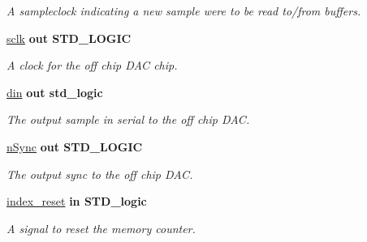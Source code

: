 \begin{DoxyCompactItemize}
\begin{DoxyCompactList}\small\item\em A sampleclock indicating a new sample were to be read to/from buffers. \end{DoxyCompactList}\item 
\hypertarget{classdac__Top_a6d01fe70bfcd66f305c9c962331782cd}{\hyperlink{classdac__Top_a6d01fe70bfcd66f305c9c962331782cd}{sclk}  {\bfseries {\bfseries \textcolor{vhdlkeyword}{out}\textcolor{vhdlchar}{ }}} {\bfseries \textcolor{comment}{S\-T\-D\-\_\-\-L\-O\-G\-I\-C}\textcolor{vhdlchar}{ }} }\label{classdac__Top_a6d01fe70bfcd66f305c9c962331782cd}

\begin{DoxyCompactList}\small\item\em A clock for the off chip D\-A\-C chip. \end{DoxyCompactList}\item 
\hypertarget{classdac__Top_a85ffcdebe13d1f5ddc75d9dc2718accd}{\hyperlink{classdac__Top_a85ffcdebe13d1f5ddc75d9dc2718accd}{din}  {\bfseries {\bfseries \textcolor{vhdlkeyword}{out}\textcolor{vhdlchar}{ }}} {\bfseries \textcolor{comment}{std\-\_\-logic}\textcolor{vhdlchar}{ }} }\label{classdac__Top_a85ffcdebe13d1f5ddc75d9dc2718accd}

\begin{DoxyCompactList}\small\item\em The output sample in serial to the off chip D\-A\-C. \end{DoxyCompactList}\item 
\hypertarget{classdac__Top_acb508fc1279abe4c1bc2be47e4dd526b}{\hyperlink{classdac__Top_acb508fc1279abe4c1bc2be47e4dd526b}{n\-Sync}  {\bfseries {\bfseries \textcolor{vhdlkeyword}{out}\textcolor{vhdlchar}{ }}} {\bfseries \textcolor{comment}{S\-T\-D\-\_\-\-L\-O\-G\-I\-C}\textcolor{vhdlchar}{ }} }\label{classdac__Top_acb508fc1279abe4c1bc2be47e4dd526b}

\begin{DoxyCompactList}\small\item\em The output sync to the off chip D\-A\-C. \end{DoxyCompactList}\item 
\hypertarget{classdac__Top_a5a1c2c67d9bb87333434aa5bbc7217ac}{\hyperlink{classdac__Top_a5a1c2c67d9bb87333434aa5bbc7217ac}{index\-\_\-reset}  {\bfseries {\bfseries \textcolor{vhdlkeyword}{in}\textcolor{vhdlchar}{ }}} {\bfseries \textcolor{comment}{S\-T\-D\-\_\-logic}\textcolor{vhdlchar}{ }} }\label{classdac__Top_a5a1c2c67d9bb87333434aa5bbc7217ac}

\begin{DoxyCompactList}\small\item\em A signal to reset the memory counter. \end{DoxyCompactList}\end{DoxyCompactItemize}


